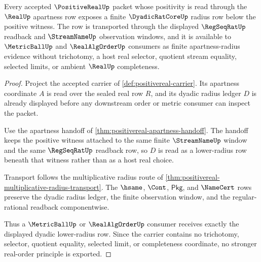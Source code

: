 \begin{theorem}
\label{thm:positive-real-dyadic-radius-lower-bound}
Every accepted $\PositiveRealUp$ packet whose positivity is read through the
$\RealUp$ apartness row exposes a finite $\DyadicRatCoreUp$ radius row below
the positive witness. The row is transported through the displayed
$\RegSeqRatUp$ readback and $\StreamNameUp$ observation windows, and it is
available to $\MetricBallUp$ and $\RealAlgOrderUp$ consumers as finite
apartness-radius evidence without trichotomy, a host real selector, quotient
stream equality, selected limits, or ambient $\RealUp$ completeness.
\end{theorem}
\begin{proof}
Project the accepted carrier of \autoref{def:positivereal-carrier}. Its
apartness coordinate $A$ is read over the sealed real row $R$, and its dyadic
radius ledger $D$ is already displayed before any downstream order or metric
consumer can inspect the packet.

Use the apartness handoff of \autoref{thm:positivereal-apartness-handoff}. The
handoff keeps the positive witness attached to the same finite
$\StreamNameUp$ window and the same $\RegSeqRatUp$ readback row, so $D$ is read
as a lower-radius row beneath that witness rather than as a host real choice.

Transport follows the multiplicative radius route of
\autoref{thm:positivereal-multiplicative-radius-transport}. The $\hsame$,
$\Cont$, $\mathsf{Pkg}$, and $\NameCert$ rows preserve the dyadic radius ledger,
the finite observation window, and the regular-rational readback componentwise.

Thus a $\MetricBallUp$ or $\RealAlgOrderUp$ consumer receives exactly the
displayed dyadic lower-radius row. Since the carrier contains no trichotomy,
selector, quotient equality, selected limit, or completeness coordinate, no
stronger real-order principle is exported.
\end{proof}

